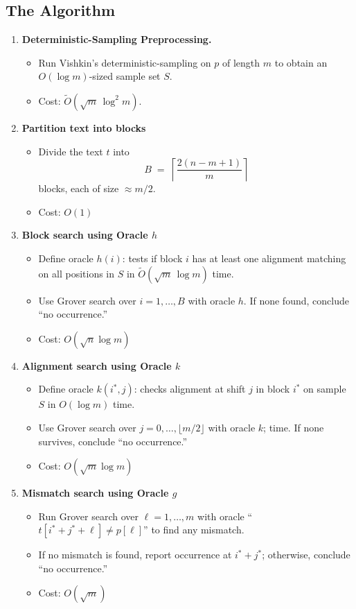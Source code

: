 \documentclass[12pt]{IEEEtran}
\begin{document}
\subsection{The Algorithm}
\begin{enumerate}
    \item \textbf{Deterministic-Sampling Preprocessing.}
          \begin{itemize}
              \item Run Vishkin's deterministic-sampling on \(p\) of length \(m\) to obtain an \(O(\log m)\)-sized sample set \(S\).
              \item Cost: \(\widetilde O(\sqrt{m}\,\log^2 m)\).
          \end{itemize}
    \item \textbf{Partition text into blocks}
          \begin{itemize}
              \item Divide the text \(t\) into
                    \[
                        B \;=\; \left\lceil \frac{2(n - m + 1)}{m} \right\rceil
                    \]
                    blocks, each of size \(\approx m/2\).
              \item Cost: \(O(1)\)
          \end{itemize}
    \item \textbf{Block search using Oracle \(h\)}
          \begin{itemize}
              \item Define oracle \(h(i)\): tests if block \(i\) has at least one alignment matching on all positions in \(S\) in \(\widetilde O(\sqrt{m}\,\log m)\) time.
              \item Use Grover search over \(i=1,\dots,B\) with oracle \(h\). If none found, conclude ``no occurrence.''
              \item Cost: \(O(\sqrt{n} \log m)\)
          \end{itemize}
    \item \textbf{Alignment search using Oracle \(k\)}
          \begin{itemize}
              \item Define oracle \(k(i^*,j)\): checks alignment at shift \(j\) in block \(i^*\) on sample \(S\) in \(O(\log m)\) time.
              \item Use Grover search over \(j=0,\dots,\lfloor m/2\rfloor\) with oracle \(k\); time. If none survives, conclude ``no occurrence.''
              \item Cost: \(O(\sqrt{m} \log m)\)
          \end{itemize}
    \item \textbf{Mismatch search using Oracle \(g\)}
          \begin{itemize}
              \item Run Grover search over \(\ell=1,\dots,m\) with oracle ``\(t[i^*+j^*+\ell]\neq p[\ell]\)'' to find any mismatch.
              \item If no mismatch is found, report occurrence at \(i^*+j^*\); otherwise, conclude ``no occurrence.''
              \item Cost: \(O(\sqrt{m})\)
          \end{itemize}
\end{enumerate}
\end{document}
